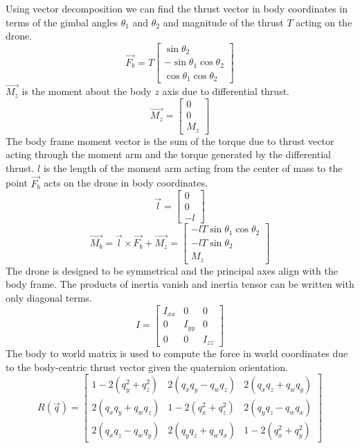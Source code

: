 \documentclass[]{article}
\begin{document}
	Using vector decomposition we can find the thrust vector in body coordinates in terms of the gimbal angles $\theta_1$ and $\theta_2$ and magnitude of the thrust $T$ acting on the drone.
\[
\vec{F_b} = T
\begin{bmatrix}
	\sin{\theta_2}  \\
	-\sin{\theta_1}\cos{\theta_2}  \\
	\cos{\theta_1}\cos{\theta_2}
\end{bmatrix}
\]
$\vec{M_z}$ is the moment about the body $z$ axis due to differential thrust. 
        \[
	\vec{M_z} =
        \begin{bmatrix}
        0  \\
        0  \\
        M_z
        \end{bmatrix}
        \]
The body frame moment vector is the sum of the torque due to thrust vector acting through the moment arm and the torque generated by the differential thrust. $l$ is the length of the moment arm acting from the center of mass to the point $\vec{F_b}$ acts on the drone in body coordinates. 
        \[
	\vec{l} =
        \begin{bmatrix}
        0  \\
        0  \\
        -l
        \end{bmatrix}
        \]
        	 \[
        \vec{M_b} = \vec{l} \times \vec{F_b} + \vec{M_z}=       
        \begin{bmatrix}
        -lT\sin{\theta_1}\cos{\theta_2}  \\
        -lT\sin{\theta_2}  \\
	M_z
        \end{bmatrix}
        \]
The drone is designed to be symmetrical and the principal axes align with the body frame. The products of inertia vanish and inertia tensor can be written with only diagonal terms.
         \[
        I =
        \begin{bmatrix}
        I_{xx} & 0 &0 \\
        0 & I_{yy }& 0 \\
        0 & 0 & I_{zz}
        \end{bmatrix}
        \]
The body to world matrix is used to compute the force in world coordinates due to the body-centric thrust vector given the quaternion orientation.
        \[
        R(\vec{q}) =
        \begin{bmatrix}
        1 - 2(q_y^2 + q_z^2) & 2(q_x q_y - q_w q_z) & 2(q_x q_z + q_w q_y) \\
        2(q_x q_y + q_w q_z) & 1 - 2(q_x^2 + q_z^2) & 2(q_y q_z - q_w q_x) \\
        2(q_x q_z - q_w q_y) & 2(q_y q_z + q_w q_x) & 1 - 2(q_x^2 + q_y^2)
        \end{bmatrix}
        \]
\end{document}
